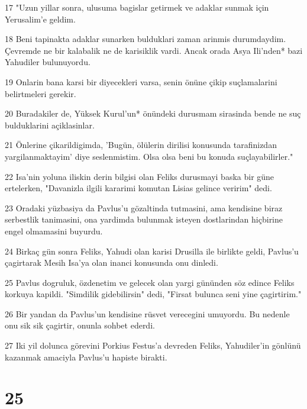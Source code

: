 \par 17 "Uzun yillar sonra, ulusuma bagislar getirmek ve adaklar sunmak için Yerusalim'e geldim.
\par 18 Beni tapinakta adaklar sunarken bulduklari zaman arinmis durumdaydim. Çevremde ne bir kalabalik ne de karisiklik vardi. Ancak orada Asya Ili'nden* bazi Yahudiler bulunuyordu.
\par 19 Onlarin bana karsi bir diyecekleri varsa, senin önüne çikip suçlamalarini belirtmeleri gerekir.
\par 20 Buradakiler de, Yüksek Kurul'un* önündeki durusmam sirasinda bende ne suç bulduklarini açiklasinlar.
\par 21 Önlerine çikarildigimda, 'Bugün, ölülerin dirilisi konusunda tarafinizdan yargilanmaktayim' diye seslenmistim. Olsa olsa beni bu konuda suçlayabilirler."
\par 22 Isa'nin yoluna iliskin derin bilgisi olan Feliks durusmayi baska bir güne ertelerken, "Davanizla ilgili kararimi komutan Lisias gelince veririm" dedi.
\par 23 Oradaki yüzbasiya da Pavlus'u gözaltinda tutmasini, ama kendisine biraz serbestlik tanimasini, ona yardimda bulunmak isteyen dostlarindan hiçbirine engel olmamasini buyurdu.
\par 24 Birkaç gün sonra Feliks, Yahudi olan karisi Drusilla ile birlikte geldi, Pavlus'u çagirtarak Mesih Isa'ya olan inanci konusunda onu dinledi.
\par 25 Pavlus dogruluk, özdenetim ve gelecek olan yargi gününden söz edince Feliks korkuya kapildi. "Simdilik gidebilirsin" dedi, "Firsat bulunca seni yine çagirtirim."
\par 26 Bir yandan da Pavlus'un kendisine rüsvet verecegini umuyordu. Bu nedenle onu sik sik çagirtir, onunla sohbet ederdi.
\par 27 Iki yil dolunca görevini Porkius Festus'a devreden Feliks, Yahudiler'in gönlünü kazanmak amaciyla Pavlus'u hapiste birakti.

\chapter{25}

